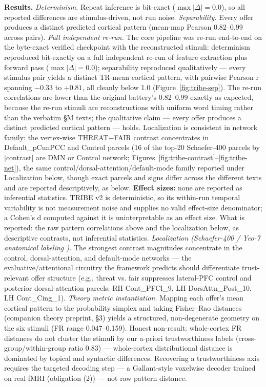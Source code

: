 \documentclass[11pt,twocolumn]{article}
\theoremstyle{plain}
\begin{document}
\textbf{Results.} \textit{Determinism.} Repeat inference is bit-exact ($\max |\Delta| = 0.0$), so all reported differences are stimulus-driven, not run noise. \textit{Separability.} Every offer produces a distinct predicted cortical pattern (mean-map Pearson 0.82–0.99 across pairs). \textit{Full independent re-run.} The core pipeline was re-run end-to-end on the byte-exact verified checkpoint with the reconstructed stimuli: determinism reproduced bit-exactly on a full independent re-run of feature extraction plus forward pass ($\max |\Delta| = 0.0$); separability reproduced qualitatively --- every stimulus pair yields a distinct TR-mean cortical pattern, with pairwise Pearson r spanning $-0.33$ to $+0.81$, all cleanly below 1.0 (Figure~\ref{fig:tribe-sep}). The re-run correlations are lower than the original battery's 0.82--0.99 exactly as expected, because the re-run stimuli are reconstructions with uniform word timing rather than the verbatim \S{}M texts; the qualitative claim --- every offer produces a distinct predicted cortical pattern --- holds. Localization is consistent in network family: the vertex-wise THREAT$-$FAIR contrast concentrates in Default\_pCunPCC and Control parcels (16 of the top-20 Schaefer-400 parcels by $|$contrast$|$ are DMN or Control network; Figures~\ref{fig:tribe-contrast}--\ref{fig:tribe-net}), the same control/dorsal-attention/default-mode family reported under Localization below, though exact parcels and signs differ across the different texts and are reported descriptively, as below. \textbf{Effect sizes:} none are reported as inferential statistics. TRIBE v2 is deterministic, so its within-run temporal variability is not measurement noise and supplies no valid effect-size denominator; a Cohen's d computed against it is uninterpretable as an effect size. What is reported: the raw pattern correlations above and the localization below, as descriptive contrasts, not inferential statistics. \textit{Localization (Schaefer-400 / Yeo-7 anatomical labeling \citep{schaefer2018}).} The strongest contrast magnitudes concentrate in the control, dorsal-attention, and default-mode networks — the evaluative/attentional circuitry the framework predicts should differentiate trust-relevant offer structure (e.g., threat vs. fair suppresses lateral-PFC control and posterior dorsal-attention parcels: RH Cont\_PFCl\_9, LH DorsAttn\_Post\_10, LH Cont\_Cing\_1). \textit{Theory metric instantiation.} Mapping each offer's mean cortical pattern to the probability simplex and taking Fisher–Rao distances (companion theory preprint, \S{}3) yields a structured, non-degenerate geometry on the six stimuli (FR range 0.047–0.159). Honest non-result: whole-cortex FR distances do not cluster the stimuli by our a-priori trustworthiness labels (cross-group/within-group ratio 0.83) — whole-cortex distributional distance is dominated by topical and syntactic differences. Recovering a trustworthiness axis requires the targeted decoding step — a Gallant-style voxelwise decoder trained on real fMRI (obligation (2)) — not raw pattern distance.
\end{document}
